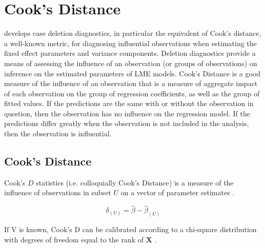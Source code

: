\documentclass[12pt, a4paper]{report}
\theoremstyle{plain}
\theoremstyle{definition}
\theoremstyle{remark}
\begin{document}



\section{Cook's Distance}
\citet{Christensen} develops  case deletion diagnostics, in particular the equivalent of  Cook's distance, a well-known metric, for diagnosing influential observations when estimating the fixed effect parameters and variance components. Deletion diagnostics provide a means of assessing the influence of an observation (or groups of observations) on inference on the estimated parameters of LME models. 
Cook's Distance is a good measure of the influence of an observation that is a measure of aggregate impact of each observation on the group of regression coefficients, as well as the group of fitted values.
If the predictions are the same with or without the observation in question, then the observation has no influence on the regression model. If the predictions differ greatly when the observation is not included in the analysis, then the observation is influential.





\subsection{Cook's Distance}%
 Cook's $D$ statistics (i.e. colloquially Cook's Distance) is a measure of the influence of observations in subset $U$ on a vector of parameter estimates \citep{cook77}.

\[ \delta_{(U)} = \hat{\beta} - \hat{\beta}_{(U)}\]

If V is known, Cook's D can be calibrated according to a chi-square distribution with degrees of freedom equal to the rank of $\boldsymbol{X}$ \citep{cpj92}.
\end{document}
